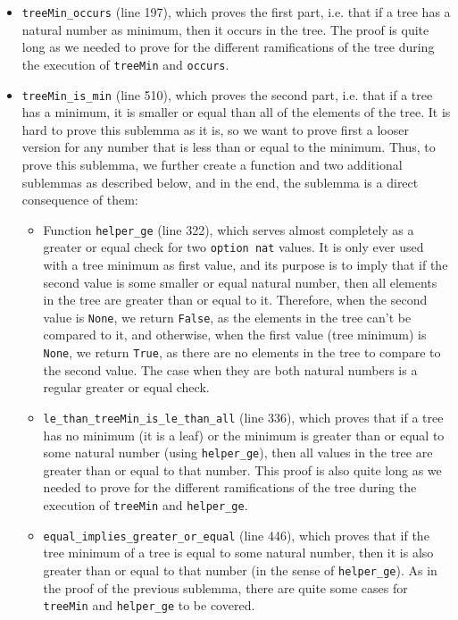 \documentclass[a4paper]{article}
\begin{document}
\begin{itemize}
    \item \texttt{treeMin\_occurs} (line 197), which proves the first part, i.e. that if a tree has a natural number as minimum, then it occurs in the tree. The proof is quite long as we needed to prove for the different ramifications of the tree during the execution of \texttt{treeMin} and \texttt{occurs}.
    \item \texttt{treeMin\_is\_min} (line 510), which proves the second part, i.e. that if a tree has a minimum, it is smaller or equal than all of the elements of the tree. It is hard to prove this sublemma as it is, so we want to prove first a looser version for any number that is less than or equal to the minimum. Thus, to prove this sublemma, we further create a function and two additional sublemmas as described below, and in the end, the sublemma is a direct consequence of them:
    \begin{itemize}
        \item Function \texttt{helper\_ge} (line 322), which serves almost completely as a greater or equal check for two \texttt{option nat} values. It is only ever used with a tree minimum as first value, and its purpose is to imply that if the second value is some smaller or equal natural number, then all elements in the tree are greater than or equal to it. Therefore, when the second value is \texttt{None}, we return \texttt{False}, as the elements in the tree can't be compared to it, and otherwise, when the first value (tree minimum) is \texttt{None}, we return \texttt{True}, as there are no elements in the tree to compare to the second value. The case when they are both natural numbers is a regular greater or equal check.
        \item \texttt{le\_than\_treeMin\_is\_le\_than\_all} (line 336), which proves that if a tree has no minimum (it is a leaf) or the minimum is greater than or equal to some natural number (using \texttt{helper\_ge}), then all values in the tree are greater than or equal to that number. This proof is also quite long as we needed to prove for the different ramifications of the tree during the execution of \texttt{treeMin} and \texttt{helper\_ge}.
        \item \texttt{equal\_implies\_greater\_or\_equal} (line 446), which proves that if the tree minimum of a tree is equal to some natural number, then it is also greater than or equal to that number (in the sense of \texttt{helper\_ge}). As in the proof of the previous sublemma, there are quite some cases for \texttt{treeMin} and \texttt{helper\_ge} to be covered.
    \end{itemize}
\end{itemize}
 
\end{document}
